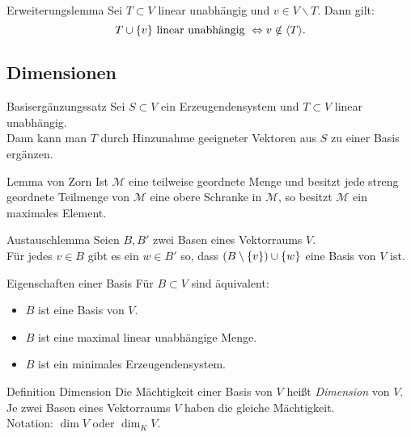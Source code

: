 \documentclass[main.tex]{subfiles}
\begin{document}
\begin{karte}{Erweiterungslemma}
    Sei \(T \subset V\) linear unabhängig und \(v \in V \backslash T \). Dann gilt: 
    \[T \cup \{v\} \text{ linear unabhängig } 
    \Leftrightarrow v \notin \langle T \rangle. \]
\end{karte}
\subsection*{Dimensionen}
\begin{karte}{Basisergänzungssatz}
    Sei \(S \subset V\) ein Erzeugendensystem und \(T \subset V\)
    linear unabhängig. \\
    Dann kann man \(T\) durch Hinzunahme geeigneter Vektoren aus \(S\)
    zu einer Basis ergänzen.
\end{karte}
\begin{karte}{Lemma von Zorn}
    Ist \(\mathcal{M}\) eine teilweise geordnete Menge und besitzt
    jede streng geordnete Teilmenge von \(\mathcal{M}\) eine obere 
    Schranke in \(\mathcal{M}\), so besitzt \(\mathcal{M}\) 
    ein maximales Element.
\end{karte}
\begin{karte}{Austauschlemma}
    Seien \(B, B'\) zwei Basen eines Vektorraums \(V\). \\ 
    Für jedes \(v \in B \) gibt es ein \(w \in B'\) so, 
    dass \((B \setminus \{v\}) \cup \{w\}\) 
    eine Basis von \(V\) ist.
\end{karte}
\begin{karte}{Eigenschaften einer Basis}
    Für \( B \subset V \) sind äquivalent: 
    \begin{itemize}
        \item \(B\) ist eine Basis von \(V\).
        \item \(B\) ist eine maximal linear unabhängige Menge.
        \item \(B\) ist ein minimales Erzeugendensystem.
    \end{itemize}
\end{karte}
\begin{karte}{Definition Dimension}
    Die Mächtigkeit einer Basis von \(V\) heißt \textit{Dimension} von \(V\). \\ 
    Je zwei Basen eines Vektorraums \(V\) haben die gleiche Mächtigkeit. \\
    Notation: \( \dim V \) oder \( \dim_K V \).
\end{karte}
\end{document}
